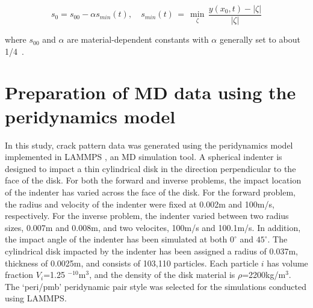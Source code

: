  \begin{equation}
s_0=s_{00}-\alpha s_{min}(t), \quad s_{min}(t)  \, = \, \min_\zeta \, {\frac{y(x_0,t)-|\zeta|}{|\zeta|}}
\end{equation}

 \noindent %
 where $s_{00}$ and $\alpha$ are material-dependent constants with $\alpha$ generally set to about 1/4~\cite{Ref4}. 

\section{Preparation of MD data using the peridynamics model }
\label{sec:3}

In this study, crack pattern data was generated using the peridynamics model implemented in LAMMPS \cite{Ref16}, an MD simulation tool.
A spherical indenter is designed to impact a thin cylindrical disk in the direction perpendicular to the face of the disk.
For both the forward and inverse problems, the impact location of the indenter has varied across the face of the disk.
For the forward problem, the radius and velocity of the indenter were fixed at 0.002m and 100m/s, respectively.
For the inverse problem, the indenter varied between two radius sizes, 0.007m and 0.008m, and two velocites, 100m/s and 100.1m/s.
In addition, the impact angle of the indenter has been simulated at both $0^{\circ}$ and $45^{\circ}$.
The cylindrical disk impacted by the indenter has been assigned a radius of 0.037m, thickness of 0.0025m, and consists of 103,110 particles.
Each particle $i$ has volume fraction $V_i$=1.25 $^{-10}$m$^3$, and the density of the disk material is $\rho$=2200kg/m$^3$.
The `peri/pmb' peridynamic pair style was selected for the simulations conducted using LAMMPS.
